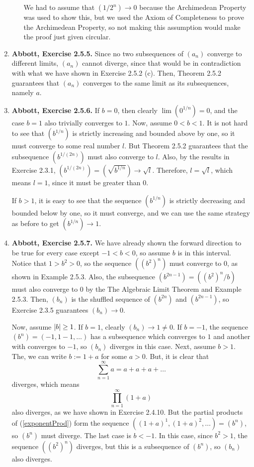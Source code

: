 \documentclass{article}
\DeclarePairedDelimiter\abs{\lvert}{\rvert}
\newcommand{\exc}[2][Abbott]{\item \textbf{#1, Exercise #2.}}
\begin{document}
\begin{enumerate}
\begin{enumerate}
        We had to assume that $(1/2^n) \to 0$ because the Archimedean Property was used to show this, but we used the Axiom of Completeness to prove the Archimedean Property, so not making this assumption would make the proof just given circular.
    \end{enumerate}
    
    \exc{2.5.5}
    Since no two subsequences of $(a_n)$ converge to different limits, $(a_n)$ cannot diverge, since that would be in contradiction with what we have shown in Exercise 2.5.2 (c). Then, Theorem 2.5.2 guarantees that $(a_n)$ converges to the same limit as its subsequences, namely $a$.
    
    \exc{2.5.6}
    If $b = 0$, then clearly $\lim(0^{1/n}) = 0$, and the case $b=1$ also trivially converges to $1$. Now, assume $0 < b < 1$. It is not hard to see that $(b^{1/n})$ is strictly increasing and bounded above by one, so it must converge to some real number $l$. But Theorem 2.5.2 guarantees that the subsequence $(b^{1/(2n)})$ must also converge to $l$. Also, by the results in Exercise 2.3.1, $(b^{1/(2n)}) = (\sqrt{b^{1/n}}) \to \sqrt{l}$. Therefore, $l = \sqrt{l}$, which means $l = 1$, since it must be greater than 0.
    
    If $b > 1$, it is easy to see that the sequence $(b^{1/n})$ is strictly decreasing and bounded below by one, so it must converge, and we can use the same strategy as before to get $(b^{1/n}) \to 1$.
    
    \exc{2.5.7}
     We have already shown the forward direction to be true for every case except $-1 < b < 0$, so assume $b$ is in this interval. Notice that $1 > b^2 > 0$, so the sequence $((b^2)^n)$ must converge to $0$, as shown in Example 2.5.3. Also, the subsequence $(b^{2n-1}) = ((b^2)^n/b)$ must also converge to $0$ by the The Algebraic Limit Theorem and Example 2.5.3. Then, $(b_n)$ is the shuffled sequence of $(b^{2n})$ and $(b^{2n-1})$, so Exercise 2.3.5 guarantees $(b_n) \to 0$.
    
    Now, assume $\abs*{b} \geq 1$. If $b = 1$, clearly $(b_n) \to 1 \neq 0$. If $b = -1$, the sequence $(b^n) = (-1,1-1,\dots)$ has a subsequence which converges to $1$ and another with converges to $-1$, so $(b_n)$ diverges in this case. Next, assume $b > 1$. The, we can write $b := 1 + a$ for some $a > 0$. But, it is clear that 
    \begin{equation*}
        \sum_{n=1}^\infty a = a + a + a + \dots
    \end{equation*} diverges, which means
    \begin{equation} \label{exponentProd}
        \prod_{n=1}^\infty (1+a)
    \end{equation} also diverges, as we have shown in Exercise 2.4.10. But the partial products of (\ref{exponentProd}) form the sequence $((1+a)^1, (1+a)^2, \dots) = (b^n)$, so $(b^n)$ must diverge. The last case is $b < -1$. In this case, since $b^2 > 1$, the sequence $((b^2)^n)$ diverges, but this is a subsequence of $(b^n)$, so $(b_n)$ also diverges.
    

\end{enumerate}
\end{document}
